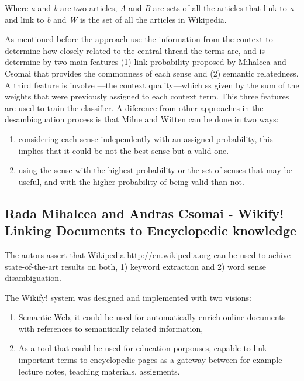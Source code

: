Where {\em a} and {\em b} are two articles, {\em A} and {\em B} are sets of all the articles that link to {\em a} and link to {\em b} and {\em W} is the set of all the articles in Wikipedia.

As mentioned before the approach use the information from the context to determine how closely related to the central thread the terms are, 
and is determine by two main features (1) link probability proposed by Mihalcea and Csomai that provides the commonness of each sense and (2) semantic relatedness. 
A third feature is involve —the context quality—which ss given by the sum of the weights that were previously assigned to each context term. 
This three features are used to train the classifier. A diference from other approaches in the desambioguation process is that Milne and Witten can be done in two ways:

\begin{enumerate}
 \item considering each sense independently with an assigned probability, this implies that it could be not the best sense but a valid one.
 \item using the sense with the highest probability or the set of senses that may be useful, and with the higher probability of being valid than not.
\end{enumerate}

\subsection{Rada Mihalcea and Andras Csomai - Wikify! Linking Documents to Encyclopedic knowledge}

The autors assert that Wikipedia \url{http://en.wikipedia.org} can be used to achive state-of-the-art results on both,
1) keyword extraction and 2) word sense disambiguation.

The Wikify! system was designed and implemented with two visions: 

\begin{enumerate}
 \item Semantic Web, it could be used for automatically enrich online documents with references to semantically related information,
 \item As a tool that could be used for education porpouses, capable to link important terms to encyclopedic pages as a gateway between for example lecture notes, 
       teaching materials, assigments.
\end{enumerate}

